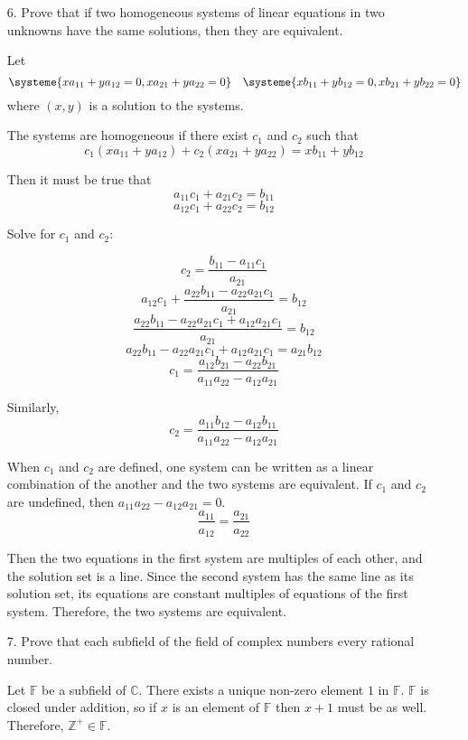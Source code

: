 \documentclass{article}
\begin{document}
\begin{enumerate}[listparindent=\parindent]
\item[6.] Prove that if two homogeneous systems of linear equations in two unknowns have the same solutions,
    then they are equivalent.

    Let
    \[
        \systeme{
            xa_{11} + ya_{12} = 0,
            xa_{21} + ya_{22} = 0
        }
        \quad
        \systeme{
            xb_{11} + yb_{12} = 0,
            xb_{21} + yb_{22} = 0
        }
    \]
    where \((x, y)\) is a solution to the systems.

    The systems are homogeneous if there exist \(c_1\) and \(c_2\) such that
    \[c_1(xa_{11} + ya_{12}) + c_2(xa_{21} + ya_{22}) = xb_{11} + yb_{12}\]

    Then it must be true that
    \[a_{11}c_1 + a_{21}c_2 = b_{11}\]
    \[a_{12}c_1 + a_{22}c_2 = b_{12}\]

    Solve for \(c_1\) and \(c_2\):

    \[c_2 = \frac{b_{11} - a_{11}c_1} {a_{21}}\]
    \[a_{12}c_1 + \frac{a_{22}b_{11} - a_{22}a_{21}c_1} {a_{21}} = b_{12}\]
    \[\frac{a_{22}b_{11} - a_{22}a_{21}c_1 + a_{12}a_{21}c_1} {a_{21}} = b_{12}\]
    \[a_{22}b_{11} - a_{22}a_{21}c_1 + a_{12}a_{21}c_1 = a_{21}b_{12}\]
    \[c_1 = \frac{a_{12}b_{21} - a_{22}b_{21}} {a_{11}a_{22} - a_{12}a_{21}}\]

    Similarly,
    \[c_2 = \frac{a_{11}b_{12} - a_{12}b_{11}} {a_{11}a_{22} - a_{12}a_{21}}\]

    When \(c_1\) and \(c_2\) are defined, one system can be written
    as a linear combination of the another and the two systems are equivalent.
    If \(c_1\) and \(c_2\) are undefined, then
    \(a_{11}a_{22} - a_{12}a_{21} = 0\).
    \[\frac{a_{11}}{a_{12}} = \frac{a_{21}}{a_{22}}\]

    Then the two equations in the first system are multiples of each other, and the solution set is a line.
    Since the second system has the same line as its solution set,
    its equations are constant multiples of equations of the first system.
    Therefore, the two systems are equivalent.

\item[7.] Prove that each subfield of the field of complex numbers every rational number.

Let \(\mathbb F\) be a subfield of \(\mathbb C\).
There exists a unique non-zero element \(1\) in \(\mathbb F\).
\(\mathbb F\) is closed under addition, so if \(x\) is an element of \(\mathbb F\) then \(x + 1\) must be as well.
Therefore, \(\mathbb Z^+ \in \mathbb F\).


\end{enumerate}
\end{document}
